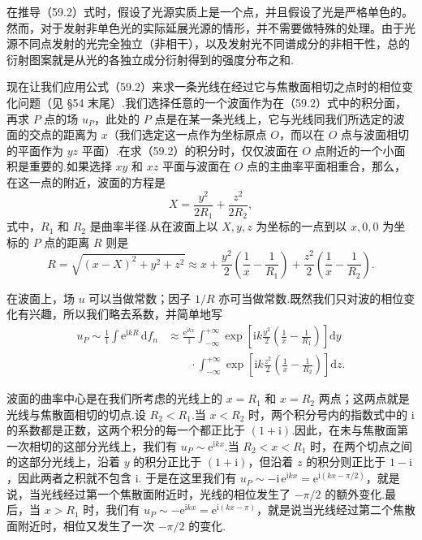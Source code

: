 在推导（59.2）式时，假设了光源实质上是一个点，并且假设了光是严格单色的。然而，对于发射非单色光的实际延展光源的情形，并不需要做特殊的处理。由于光源不同点发射的光完全独立（非相干），以及发射光不同谱成分的非相干性，总的衍射图案就是从光的各独立成分衍射得到的强度分布之和.

现在让我们应用公式（59.2）来求一条光线在经过它与焦散面相切之点时的相位变化问题（见 §54 末尾）.我们选择任意的一个波面作为在（59.2）式中的积分面，再求 $P$ 点的场 $u_P$，此处的 $P$ 点是在某一条光线上，它与光线同我们所选定的波面的交点的距离为 $x$（我们选定这一点作为坐标原点 $O$，而以在 $O$ 点与波面相切的平面作为 $yz$ 平面）.在求（59.2）的积分时，仅仅波面在 $O$ 点附近的一个小面积是重要的.如果选择 $xy$ 和 $xz$ 平面与波面在 $O$ 点的主曲率平面相重合，那么，在这一点的附近，波面的方程是
\begin{equation*}
  X=\frac{y^2}{2R_1}+\frac{z^2}{2R_2},
\end{equation*}
式中，$R_1$ 和 $R_2$ 是曲率半径.从在波面上以 $X,y,z$ 为坐标的一点到以 $x,0,0$ 为坐标的 $P$ 点的距离 $R$ 则是
\begin{equation*}
  R=\sqrt{(x-X)^2+y^2+z^2}
  \approx x+\frac{y^2}{2}\left(\frac{1}{x}-\frac{1}{R_1}\right)
  +\frac{z^2}{2}\left(\frac{1}{x}-\frac{1}{R_2}\right).
\end{equation*}

在波面上，场 $u$ 可以当做常数；因子 $1/R$ 亦可当做常数.既然我们只对波的相位变化有兴趣，所以我们略去系数，并简单地写
\begin{equation}
\begin{aligned}
  u_P\sim\frac{1}{\mathrm{i}}\int\mathrm{e}^{\mathrm{i}kR}\,\mathrm{d}f_n
  &\approx\frac{\mathrm{e}^{\mathrm{i}kx}}{\mathrm{i}}
  \int_{-\infty}^{+\infty}\exp\left[\mathrm{i}k\frac{y^2}{2}
  \left(\frac{1}{x}-\frac{1}{R_1}\right)\right]\mathrm{d}y\\
  &\qquad\cdot\int_{-\infty}^{+\infty}\exp\left[\mathrm{i}k\frac{z^2}{2}
  \left(\frac{1}{x}-\frac{1}{R_2}\right)\right]\mathrm{d}z.
\end{aligned}
\end{equation}

波面的曲率中心是在我们所考虑的光线上的 $x=R_1$ 和 $x=R_2$ 两点；这两点就是光线与焦散面相切的切点.设 $R_2<R_1$.当 $x<R_2$ 时，两个积分号内的指数式中的 $\mathrm{i}$ 的系数都是正数，这两个积分的每一个都正比于 $(1+\mathrm{i})$.因此，在未与焦散面第一次相切的这部分光线上，我们有 $u_P\sim\mathrm{e}^{\mathrm{i}kx}$.当 $R_2<x<R_1$ 时，在两个切点之间的这部分光线上，沿着 $y$ 的积分正比于 $(1+\mathrm{i})$，但沿着 $z$ 的积分则正比于 $1-\mathrm{i}$，因此两者之积就不包含 $\mathrm{i}$. 于是在这里我们有 $u_P\sim-\mathrm{i}\,\mathrm{e}^{\mathrm{i}kx}=\mathrm{e}^{\mathrm{i}(kx-\pi/2)}$，就是说，当光线经过第一个焦散面附近时，光线的相位发生了 $-\pi/2$ 的额外变化.最后，当 $x>R_1$ 时，我们有 $u_P\sim-\mathrm{e}^{\mathrm{i}kx}=\mathrm{e}^{\mathrm{i}(kx-\pi)}$，就是说当光线经过第二个焦散面附近时，相位又发生了一次 $-\pi/2$ 的变化.

